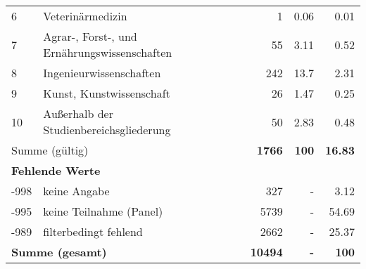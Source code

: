 \begin{longtable}{lXrrr}
     6 &
     \multicolumn{1}{X}{ Veterinärmedizin   } &


       \num{1} &
       \num[round-mode=places,round-precision=2]{0,06} &
         \num[round-mode=places,round-precision=2]{0,01} \\

     7 &
     \multicolumn{1}{X}{ Agrar-, Forst-, und Ernährungswissenschaften   } &


       \num{55} &
       \num[round-mode=places,round-precision=2]{3,11} &
         \num[round-mode=places,round-precision=2]{0,52} \\

     8 &
     \multicolumn{1}{X}{ Ingenieurwissenschaften   } &


       \num{242} &
       \num[round-mode=places,round-precision=2]{13,7} &
         \num[round-mode=places,round-precision=2]{2,31} \\

     9 &
     \multicolumn{1}{X}{ Kunst, Kunstwissenschaft   } &


       \num{26} &
       \num[round-mode=places,round-precision=2]{1,47} &
         \num[round-mode=places,round-precision=2]{0,25} \\

     10 &
     \multicolumn{1}{X}{ Außerhalb der Studienbereichsgliederung   } &


       \num{50} &
       \num[round-mode=places,round-precision=2]{2,83} &
         \num[round-mode=places,round-precision=2]{0,48} \\
     \midrule
     \multicolumn{2}{l}{Summe (gültig)} &
       \textbf{\num{1766}} &
     \textbf{100} &
       \textbf{\num[round-mode=places,round-precision=2]{16,83}} \\
     \multicolumn{5}{l}{\textbf{Fehlende Werte}}\\
       -998 &
       keine Angabe &
         \num{327} &
        - &
         \num[round-mode=places,round-precision=2]{3,12} \\
       -995 &
       keine Teilnahme (Panel) &
         \num{5739} &
        - &
         \num[round-mode=places,round-precision=2]{54,69} \\
       -989 &
       filterbedingt fehlend &
         \num{2662} &
        - &
         \num[round-mode=places,round-precision=2]{25,37} \\
     \midrule
     \multicolumn{2}{l}{\textbf{Summe (gesamt)}} &
          \textbf{\num{10494}} &
        \textbf{-} &
        \textbf{100} \\
     \bottomrule
     \end{longtable}
     
